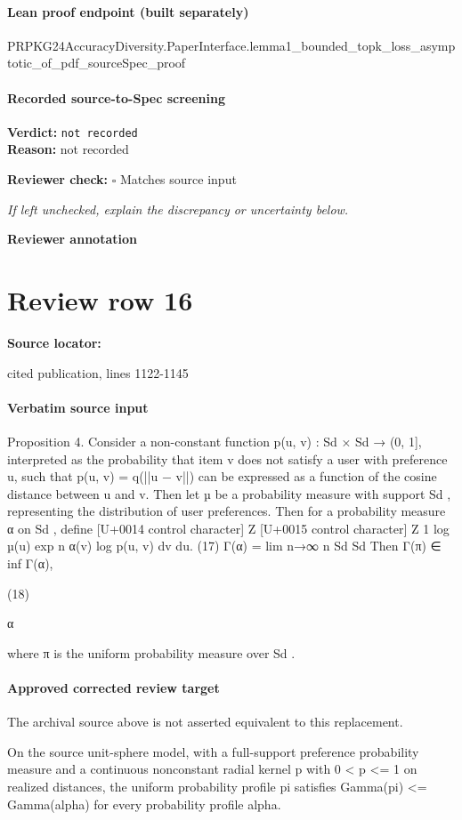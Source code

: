 \documentclass[10pt]{article}
\newcommand{\reviewerbox}{%
  \par\noindent\fbox{\parbox{0.96\linewidth}{\rule{0pt}{0.38in}}}\par
}
\newcommand{\reviewmatch}[1]{%
  \par\noindent\textbf{Reviewer check:} $\square$\; #1\par
  \noindent\emph{If left unchecked, explain the discrepancy or uncertainty below.}\par
}
\begin{document}
\paragraph{Lean proof endpoint (built separately)}\begin{ReviewVerbatim}
PRPKG24AccuracyDiversity.PaperInterface.lemma1_bounded_topk_loss_asymptotic_of_pdf_sourceSpec_proof
\end{ReviewVerbatim}

\paragraph{Recorded source-to-Spec screening}
\textbf{Verdict:} \texttt{not recorded}
\\
\textbf{Reason:} not recorded
\reviewmatch{Matches source input}
\noindent\textbf{Reviewer annotation}\par
\reviewerbox
\clearpage
\hypertarget{source-claim-28a8fb49d83f5d5a}{}
\section*{Review row 16}
\textbf{Source locator:} {\footnotesize\raggedright cited publication, lines 1122-\allowbreak{}1145\par}
\paragraph{Verbatim source input}
\begin{ReviewVerbatim}
Proposition 4. Consider a non-constant function p(u, v) : Sd × Sd → (0, 1], interpreted as the probability
that item v does not satisfy a user with preference u, such that p(u, v) = q(||u − v||) can be expressed as
a function of the cosine distance between u and v. Then let µ be a probability measure with support Sd ,
representing the distribution of user preferences. Then for a probability measure α on Sd , define
[U+0014 control character] Z
[U+0015 control character]
Z
1
log
µ(u) exp n
α(v) log p(u, v) dv du.
(17)
Γ(α) = lim
n→∞ n
Sd
Sd
Then
Γ(π) ∈ inf Γ(α),

(18)

α

where π is the uniform probability measure over Sd .
\end{ReviewVerbatim}

\paragraph{Approved corrected review target}
The archival source above is not asserted equivalent to this replacement.
\begin{ReviewVerbatim}
On the source unit-sphere model, with a full-support preference probability measure and a continuous nonconstant radial kernel p with 0 < p <= 1 on realized distances, the uniform probability profile pi satisfies Gamma(pi) <= Gamma(alpha) for every probability profile alpha.
\end{ReviewVerbatim}
\end{document}
